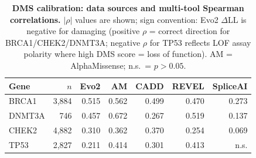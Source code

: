 \documentclass[11pt]{article}
\begin{document}
\begin{table}[h]
  \centering
  \caption{\textbf{DMS calibration: data sources and multi-tool Spearman correlations.}
    $|\rho|$ values are shown; sign convention: Evo2 $\Delta$LL is negative for damaging
    (positive $\rho$ = correct direction for BRCA1/CHEK2/DNMT3A; negative $\rho$ for TP53
    reflects LOF assay polarity where high DMS score = loss of function).
    AM = AlphaMissense; n.s.\ = $p > 0.05$.}
  \label{tab:dms_multitool}
  \small
  \begin{tabular}{lrrrrrr}
    \toprule
    Gene & $n$ & Evo2 & AM & CADD & REVEL & SpliceAI \\
    \midrule
    BRCA1  & 3,884 & 0.515 & 0.562 & 0.499 & 0.470 & 0.273 \\
    DNMT3A & 746   & 0.457 & 0.672 & 0.267 & 0.519 & 0.137 \\
    CHEK2  & 4,882 & 0.310 & 0.362 & 0.370 & 0.254 & 0.069 \\
    TP53   & 2,827 & 0.211 & 0.414 & 0.301 & 0.413 & n.s.  \\
    \bottomrule
  \end{tabular}
\end{table}
\end{document}
